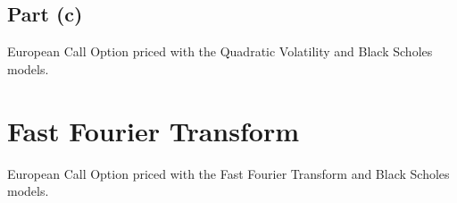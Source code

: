 \documentclass[10pt]{article}
\begin{document}
\subsection{Part (c)}

\begin{table}[!h]
    \centering
    \caption{European Call Option priced with the Quadratic Volatility and Black Scholes models.}
    \label{table:q1:opt_prices}
\end{table}



\section{Fast Fourier Transform}

\begin{table}[!h]
    \centering
    \caption{European Call Option priced with the Fast Fourier Transform and Black Scholes models.}
    \label{table:q2:fft_prices}
\end{table}



\pagebreak
\end{document}
